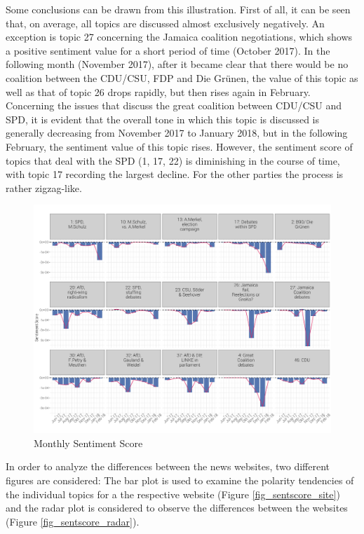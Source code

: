 \documentclass[12pt,a4paper,notitlepage]{article}
\begin{document}
Some conclusions can be drawn from this illustration. First of all, it can be seen that, on average, all topics are discussed almost exclusively negatively. An exception is topic 27 concerning the Jamaica coalition negotiations, which shows a positive sentiment value for a short period of time (October 2017). In the following month (November 2017), after it became clear that there would be no coalition between the CDU/CSU, FDP and Die Grünen, the value of this topic as well as that of topic 26 drops rapidly, but then rises again in February. Concerning the issues that discuss the great coalition between CDU/CSU and SPD, it is evident that the overall tone in which this topic is discussed is generally decreasing from November 2017 to January 2018, but in the following February, the sentiment value of this topic rises. However, the sentiment score of topics that deal with the SPD (1, 17, 22) is diminishing in the course of time, with topic 17 recording the largest decline. For the other parties the process is rather zigzag-like.

\begin{figure}[H]
	\caption{Monthly Sentiment Score}
		\begin{center}
			\includegraphics[width=\textwidth,keepaspectratio]{../figs/sentscore_monthly.png}
		\end{center}
	\label{fig_sentscore_monthly}
\end{figure}

In order to analyze the differences between the news websites, two different figures are considered: The bar plot is used to examine the polarity tendencies of the individual topics for a the respective website (Figure \ref{fig_sentscore_site}) and the radar plot is considered to observe the differences between the websites (Figure \ref{fig_sentscore_radar}).
\end{document}
